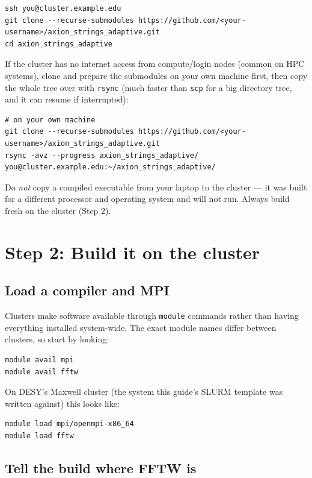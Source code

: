 \documentclass[11pt]{article}
\begin{document}
\begin{lstlisting}
ssh you@cluster.example.edu
git clone --recurse-submodules https://github.com/<your-username>/axion_strings_adaptive.git
cd axion_strings_adaptive
\end{lstlisting}

If the cluster has no internet access from compute/login nodes (common on HPC systems), clone and prepare
the submodules on your own machine first, then copy the whole tree over with \texttt{rsync} (much faster
than \texttt{scp} for a big directory tree, and it can resume if interrupted):

\begin{lstlisting}
# on your own machine
git clone --recurse-submodules https://github.com/<your-username>/axion_strings_adaptive.git
rsync -avz --progress axion_strings_adaptive/ you@cluster.example.edu:~/axion_strings_adaptive/
\end{lstlisting}

\begin{note}
Do \emph{not} copy a compiled executable from your laptop to the cluster --- it was built for a different
processor and operating system and will not run. Always build fresh on the cluster (Step 2).
\end{note}

\section{Step 2: Build it on the cluster}

\subsection{Load a compiler and MPI}

Clusters make software available through \texttt{module} commands rather than having everything installed
system-wide. The exact module names differ between clusters, so start by looking:

\begin{lstlisting}
module avail mpi
module avail fftw
\end{lstlisting}

On DESY's Maxwell cluster (the system this guide's SLURM template was written against) this looks like:

\begin{lstlisting}
module load mpi/openmpi-x86_64
module load fftw
\end{lstlisting}

\subsection{Tell the build where FFTW is}
\end{document}
